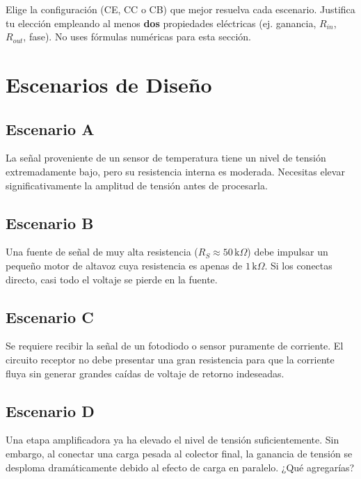 \documentclass[11pt, a4paper]{article}
\begin{document}
\begin{tcolorbox}[colback=ucbblue!5, colframe=ucbblue, title=\textbf{Ejercicio: Selección de Topología Basada en Función}]
    Elige la configuración (CE, CC o CB) que mejor resuelva cada escenario. Justifica tu elección empleando al menos \textbf{dos} propiedades eléctricas (ej. ganancia, $R_{in}$, $R_{out}$, fase). No uses fórmulas numéricas para esta sección.
\end{tcolorbox}

\section*{Escenarios de Diseño}

\subsection*{Escenario A}
La señal proveniente de un sensor de temperatura tiene un nivel de tensión extremadamente bajo, pero su resistencia interna es moderada. Necesitas elevar significativamente la amplitud de tensión antes de procesarla.
\vspace{2cm}

\subsection*{Escenario B}
Una fuente de señal de muy alta resistencia ($R_S \approx 50\,\text{k}\Omega$) debe impulsar un pequeño motor de altavoz cuya resistencia es apenas de $1\,\text{k}\Omega$. Si los conectas directo, casi todo el voltaje se pierde en la fuente.
\vspace{2cm}

\subsection*{Escenario C}
Se requiere recibir la señal de un fotodiodo o sensor puramente de corriente. El circuito receptor no debe presentar una gran resistencia para que la corriente fluya sin generar grandes caídas de voltaje de retorno indeseadas.
\vspace{2cm}

\subsection*{Escenario D}
Una etapa amplificadora ya ha elevado el nivel de tensión suficientemente. Sin embargo, al conectar una carga pesada al colector final, la ganancia de tensión se desploma dramáticamente debido al efecto de carga en paralelo. ¿Qué agregarías?
\vspace{2cm}
\end{document}
